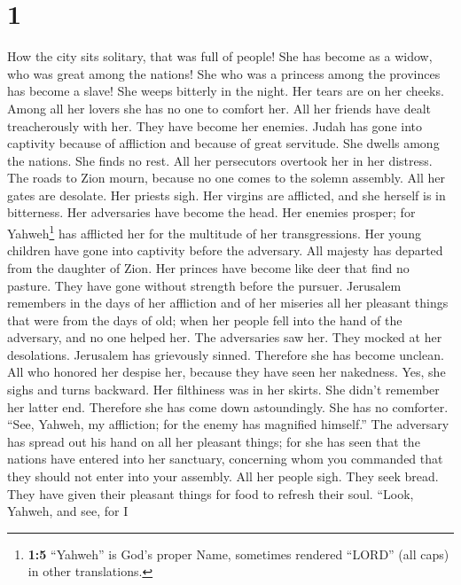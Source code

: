 \hypertarget{section}{%
\section{1}\label{section}}

 How the city sits solitary, that was full of people! She
has become as a widow, who was great among the nations! She who was a
princess among the provinces has become a slave!  She
weeps bitterly in the night. Her tears are on her cheeks. Among all her
lovers she has no one to comfort her. All her friends have dealt
treacherously with her. They have become her enemies. 
Judah has gone into captivity because of affliction and because of great
servitude. She dwells among the nations. She finds no rest. All her
persecutors overtook her in her distress.  The roads to
Zion mourn, because no one comes to the solemn assembly. All her gates
are desolate. Her priests sigh. Her virgins are afflicted, and she
herself is in bitterness.  Her adversaries have become the
head. Her enemies prosper; for Yahweh\footnote{\textbf{1:5} ``Yahweh''
  is God's proper Name, sometimes rendered ``LORD'' (all caps) in other
  translations.} has afflicted her for the multitude of her
transgressions. Her young children have gone into captivity before the
adversary.  All majesty has departed from the daughter of
Zion. Her princes have become like deer that find no pasture. They have
gone without strength before the pursuer.  Jerusalem
remembers in the days of her affliction and of her miseries all her
pleasant things that were from the days of old; when her people fell
into the hand of the adversary, and no one helped her. The adversaries
saw her. They mocked at her desolations.  Jerusalem has
grievously sinned. Therefore she has become unclean. All who honored her
despise her, because they have seen her nakedness. Yes, she sighs and
turns backward.  Her filthiness was in her skirts. She
didn't remember her latter end. Therefore she has come down
astoundingly. She has no comforter. ``See, Yahweh, my affliction; for
the enemy has magnified himself.''  The adversary has
spread out his hand on all her pleasant things; for she has seen that
the nations have entered into her sanctuary, concerning whom you
commanded that they should not enter into your assembly. 
All her people sigh. They seek bread. They have given their pleasant
things for food to refresh their soul. ``Look, Yahweh, and see, for I
